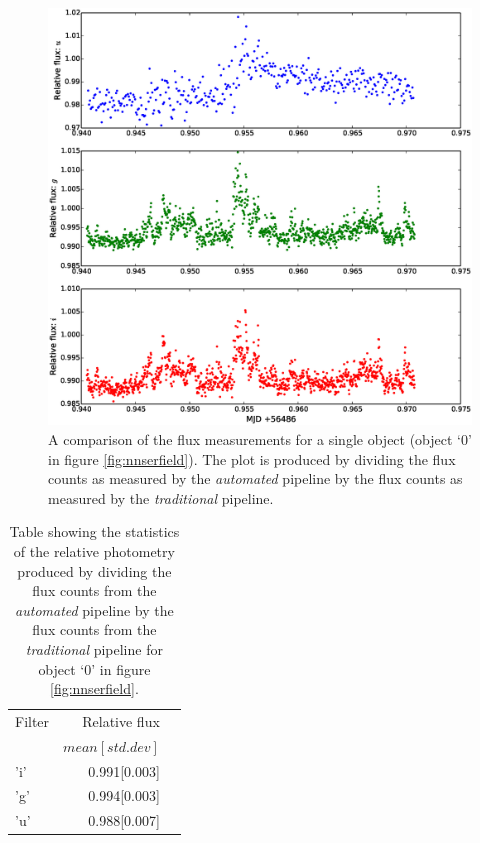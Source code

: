 \begin{figure}[!h]
\centering
\includegraphics[width=140mm]{images/compare_photometry.eps}
\caption{A comparison of the flux measurements for a single object (object `0' in figure \ref{fig:nnserfield}). The plot is produced by dividing the flux counts as measured by the \emph{automated} pipeline by the flux counts as measured by the \emph{traditional} pipeline.}
\label{fig:comparephotometry}
\end{figure}

\begin{table}
  \label{tab:differential}
  \centering
  \begin{tabular}{|l|r|r|}
    \hline
    Filter & Relative flux  \\
           &  $mean[std. dev]$ \\
    \hline
    'i'    & 0.991[0.003] \\
    'g'    & 0.994[0.003] \\
    'u'    & 0.988[0.007] \\
    \hline
   \end{tabular}
  \caption{Table showing the statistics of the relative photometry produced by dividing the flux counts from the \emph{automated} pipeline by the flux counts from the \emph{traditional} pipeline for object `0' in figure \ref{fig:nnserfield}.}
\end{table}

